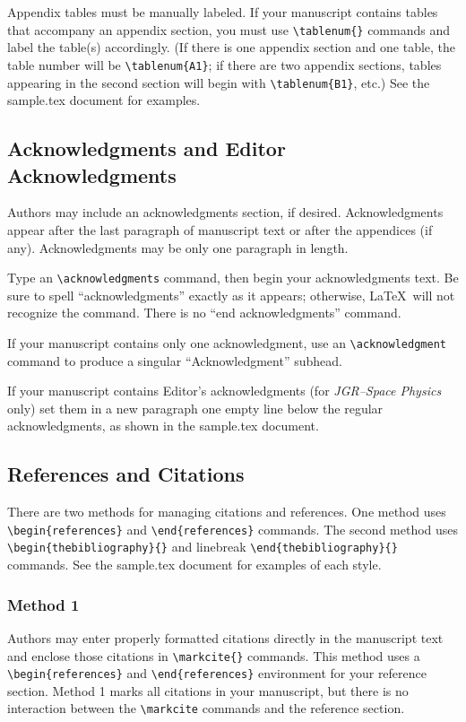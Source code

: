 \begin{article}
Appendix tables must be manually labeled.  If your manuscript 
contains tables that accompany an appendix section, you must 
use \verb"\tablenum{}" commands and label the table(s) accordingly.
(If there is one appendix section and one table, the table 
number will be \verb"\tablenum{A1}"; if there are two appendix 
sections, tables appearing in the second section will begin 
with \verb"\tablenum{B1}", etc.)  See the sample.tex document for
examples.


\subsection{Acknowledgments and Editor \protect\\
Acknowledgments}

Authors may include an acknowledgments section, if 
desired.  Acknowledgments appear after the last paragraph 
of manuscript text or after the appendices (if any).
Acknowledgments may be only one paragraph in length.

Type an \verb"\acknowledgments" command, then begin your 
acknowledgments text.  Be sure to spell ``acknowledgments'' 
exactly as it appears; otherwise, \LaTeX\ will not recognize 
the command.  There is no ``end acknowledgments'' command.

If your manuscript contains only one acknowledgment, use 
an \verb"\acknowledgment" command to produce a singular 
``Acknowledgment'' subhead.

If your manuscript contains Editor's acknowledgments (for
{\it JGR--Space Physics} only) set them in a new paragraph 
one empty line below the regular acknowledgments, as shown 
in the sample.tex document.

\subsection{References and Citations}

There are two methods for managing citations and 
references.  One method uses \verb"\begin{references}"
and \verb"\end{references}" commands.  The second \linebreak
method uses \verb"\begin{thebibliography}{}" and linebreak
\verb"\end{thebibliography}{}" commands.  See the 
sample.tex document for examples of each style.


\subsubsection{Method 1}
Authors may enter properly formatted citations directly 
in the manuscript text and enclose those citations in 
\verb"\markcite{}" commands.  This method uses a 
\verb"\begin{references}" and \verb"\end{references}" 
environment for your reference section.  Method 1 
marks all citations in your manuscript, but there 
is no interaction between the \verb"\markcite" 
commands and the reference section.


\end{article}
